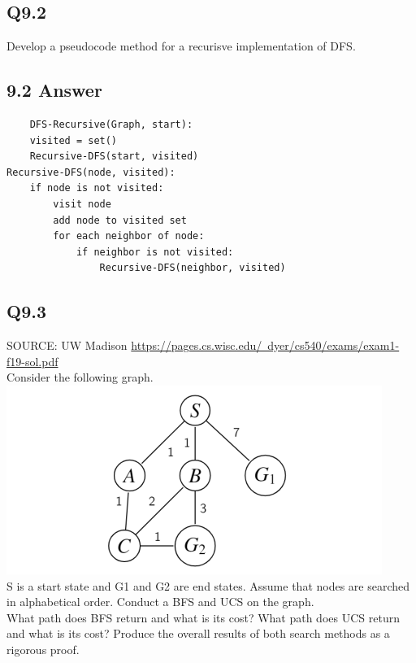 \documentclass{article}
\begin{document}
\subsection*{Q9.2}
Develop a pseudocode method for a recurisve implementation of DFS.
\newpage
\subsection*{9.2 Answer}
\begin{verbatim}
    DFS-Recursive(Graph, start):
    visited = set()
    Recursive-DFS(start, visited)
Recursive-DFS(node, visited):
    if node is not visited:
        visit node
        add node to visited set
        for each neighbor of node:
            if neighbor is not visited:
                Recursive-DFS(neighbor, visited)
\end{verbatim}
\newpage

\subsection*{Q9.3}
SOURCE: UW Madison \href{https://pages.cs.wisc.edu/~dyer/cs540/exams/exam1-f19-sol.pdf}{https://pages.cs.wisc.edu/~dyer/cs540/exams/exam1-f19-sol.pdf}
\\ Consider the following graph.
\\ \includegraphics{UCS_question_graph.png}
\\ S is a start state and G1 and G2 are end states. Assume that nodes are searched in alphabetical order. Conduct a BFS and UCS on the graph.
\\ What path does BFS return and what is its cost? What path does UCS return and what is its cost? Produce the overall
results of both search methods as a rigorous proof.
\newpage
\end{document}

